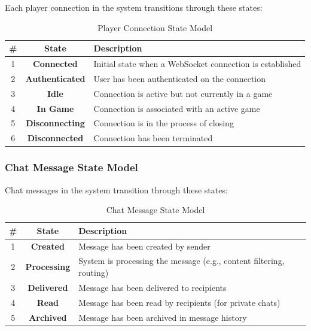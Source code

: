 Each player connection in the system transitions through these states:

\begin{table}[H]
    \centering
    \begin{tabular}{|c|c|l|}
        \hline
        \textbf{\#} & \textbf{State} & \textbf{Description} \\
        \hline
        1 & \textbf{Connected} & Initial state when a WebSocket connection is established \\
        \hline
        2 & \textbf{Authenticated} & User has been authenticated on the connection \\
        \hline
        3 & \textbf{Idle} & Connection is active but not currently in a game \\
        \hline
        4 & \textbf{In Game} & Connection is associated with an active game \\
        \hline
        5 & \textbf{Disconnecting} & Connection is in the process of closing \\
        \hline
        6 & \textbf{Disconnected} & Connection has been terminated \\
        \hline
    \end{tabular}
    \caption{Player Connection State Model}
    \label{tab:player-connection-states}
\end{table}


\subsubsection{Chat Message State Model}

Chat messages in the system transition through these states:

\begin{table}[H]
    \centering
    \begin{tabular}{|c|c|l|}
        \hline
        \textbf{\#} & \textbf{State} & \textbf{Description} \\
        \hline
        1 & \textbf{Created} & Message has been created by sender \\
        \hline
        2 & \textbf{Processing} & System is processing the message (e.g., content filtering, routing) \\
        \hline
        3 & \textbf{Delivered} & Message has been delivered to recipients \\
        \hline
        4 & \textbf{Read} & Message has been read by recipients (for private chats) \\
        \hline
        5 & \textbf{Archived} & Message has been archived in message history \\
        \hline
    \end{tabular}
    \caption{Chat Message State Model}
    \label{tab:chat-message-states}
\end{table}


